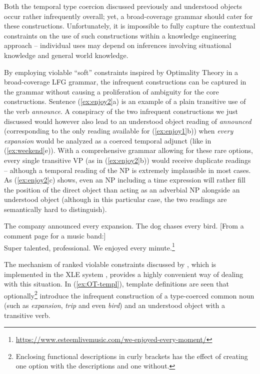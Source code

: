 \documentclass[output=paper,hidelinks]{langscibook}
\begin{document}
Both the temporal type coercion discussed previously and understood objects occur rather infrequently overall; yet, a broad-coverage grammar should cater for these constructions. Unfortunately, it is impossible to fully capture the contextual constraints on the use of such constructions within a knowledge engineering approach -- individual uses may depend on inferences involving situational knowledge and general world knowledge.

By employing violable ``soft'' constraints inspired by Optimality Theory in a broad-coverage LFG grammar, the infrequent constructions can be captured in the grammar without causing a proliferation of ambiguity for the core constructions. Sentence (\ref{ex:enjoy2}a) is an example of a plain transitive use of the verb \emph{announce}. A conspiracy of the two infrequent constructions we just discussed would however also lead to an understood object reading of \emph{announced} (corresponding to the only reading available for (\ref{ex:enjoy1}b)) when \emph{every expansion} would be analyzed as a coerced temporal adjunct (like in (\ref{ex:weekend}e)). With a comprehensive grammar allowing for these rare options, every single transitive VP (as in (\ref{ex:enjoy2}b)) would receive duplicate readings -- although a temporal reading of the NP is extremely implausible in most cases. As (\ref{ex:enjoy2}c) shows, even an NP including a time expression will rather fill the position of the direct object than acting as an adverbial NP alongside an understood object (although in this particular case, the two readings are semantically hard to distinguish). 

\ea\label{ex:enjoy2}
\ea The company announced every expansion.
\ex The dog chases every bird.
\ex {}[From a comment page for a music band:] \\Super talented, professional. We enjoyed every minute.\footnote{\url{https://www.esteemlivemusic.com/we-enjoyed-every-moment/}}
\z
\z

The mechanism of ranked violable constraints discussed by \citet{franketal01}, which is implemented in the XLE system \citep{xledoc}, %
provides a highly convenient way of dealing with this situation.  In (\ref{ex:OT-templ}), template definitions are seen that optionally\footnote{Enclosing functional descriptions in curly brackets has the effect of creating one option with the descriptions and one without.} introduce the infrequent construction of a type-coerced common noun (such as \emph{expansion}, \emph{trip} and even \emph{bird}) and an understood object with a transitive verb.
\end{document}
